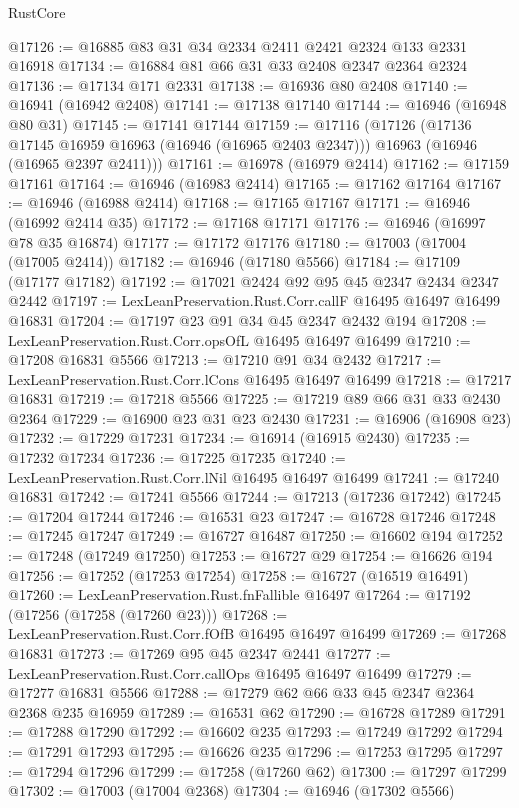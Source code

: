 \begin{lexlean}{RustCore}
\begin{coremodule}
@17126 := @16885 @83 @31 @34 @2334 @2411 @2421 @2324 @133 @2331 @16918
@17134 := @16884 @81 @66 @31 @33 @2408 @2347 @2364 @2324
@17136 := @17134 @171 @2331
@17138 := @16936 @80 @2408
@17140 := @16941 (@16942 @2408)
@17141 := @17138 @17140
@17144 := @16946 (@16948 @80 @31)
@17145 := @17141 @17144
@17159 := @17116
    (@17126
      (@17136 @17145 @16959 @16963 (@16946 (@16965 @2403 @2347)))
      @16963
      (@16946 (@16965 @2397 @2411)))
@17161 := @16978 (@16979 @2414)
@17162 := @17159 @17161
@17164 := @16946 (@16983 @2414)
@17165 := @17162 @17164
@17167 := @16946 (@16988 @2414)
@17168 := @17165 @17167
@17171 := @16946 (@16992 @2414 @35)
@17172 := @17168 @17171
@17176 := @16946 (@16997 @78 @35 @16874)
@17177 := @17172 @17176
@17180 := @17003 (@17004 (@17005 @2414))
@17182 := @16946 (@17180 @5566)
@17184 := @17109 (@17177 @17182)
@17192 := @17021 @2424 @92 @95 @45 @2347 @2434 @2347 @2442
@17197 := LexLeanPreservation.Rust.Corr.callF @16495 @16497 @16499 @16831
@17204 := @17197 @23 @91 @34 @45 @2347 @2432 @194
@17208 := LexLeanPreservation.Rust.Corr.opsOfL @16495 @16497 @16499
@17210 := @17208 @16831 @5566
@17213 := @17210 @91 @34 @2432
@17217 := LexLeanPreservation.Rust.Corr.lCons @16495 @16497 @16499
@17218 := @17217 @16831
@17219 := @17218 @5566
@17225 := @17219 @89 @66 @31 @33 @2430 @2364
@17229 := @16900 @23 @31 @23 @2430
@17231 := @16906 (@16908 @23)
@17232 := @17229 @17231
@17234 := @16914 (@16915 @2430)
@17235 := @17232 @17234
@17236 := @17225 @17235
@17240 := LexLeanPreservation.Rust.Corr.lNil @16495 @16497 @16499
@17241 := @17240 @16831
@17242 := @17241 @5566
@17244 := @17213 (@17236 @17242)
@17245 := @17204 @17244
@17246 := @16531 @23
@17247 := @16728 @17246
@17248 := @17245 @17247
@17249 := @16727 @16487
@17250 := @16602 @194
@17252 := @17248 (@17249 @17250)
@17253 := @16727 @29
@17254 := @16626 @194
@17256 := @17252 (@17253 @17254)
@17258 := @16727 (@16519 @16491)
@17260 := LexLeanPreservation.Rust.fnFallible @16497
@17264 := @17192 (@17256 (@17258 (@17260 @23)))
@17268 := LexLeanPreservation.Rust.Corr.fOfB @16495 @16497 @16499
@17269 := @17268 @16831
@17273 := @17269 @95 @45 @2347 @2441
@17277 := LexLeanPreservation.Rust.Corr.callOps @16495 @16497 @16499
@17279 := @17277 @16831 @5566
@17288 := @17279 @62 @66 @33 @45 @2347 @2364 @2368 @235 @16959
@17289 := @16531 @62
@17290 := @16728 @17289
@17291 := @17288 @17290
@17292 := @16602 @235
@17293 := @17249 @17292
@17294 := @17291 @17293
@17295 := @16626 @235
@17296 := @17253 @17295
@17297 := @17294 @17296
@17299 := @17258 (@17260 @62)
@17300 := @17297 @17299
@17302 := @17003 (@17004 @2368)
@17304 := @16946 (@17302 @5566)

\end{coremodule}
\end{lexlean}
